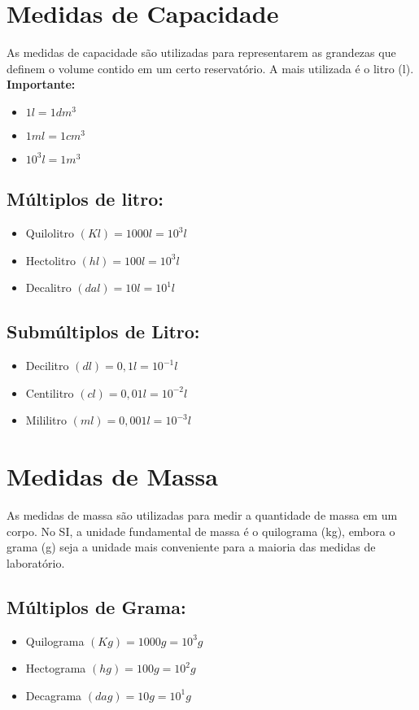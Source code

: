 \documentclass[11pt,fleqn]{book} %
\begin{document}
\section{Medidas de Capacidade}
As medidas de capacidade são utilizadas para representarem
as grandezas que definem o volume contido em um certo
reservatório. A mais utilizada é o litro (l).
	\\\textbf{Importante:}
\begin{itemize}
    \item $1l = 1dm^3$
    \item $1 ml = 1 cm^3$
    \item $10^3 l = 1 m^3$
\end{itemize}
\subsection{Múltiplos de litro:}
\begin{itemize}
    \item Quilolitro $(Kl) = 1000 l = 10^3 l$
    \item Hectolitro $(hl) = 100 l = 10^3 l$
    \item Decalitro $(dal) = 10 l = 10^1l$
\end{itemize}
\subsection{Submúltiplos de Litro:}
\begin{itemize}
    \item Decilitro $(dl) = 0,1 l = 10^{-1}l$
    \item Centilitro $(cl) = 0,01 l = 10^{-2}l$
    \item Mililitro $(ml) = 0,001 l = 10^{-3}l$
\end{itemize}
\section{Medidas de Massa}
As medidas de massa são utilizadas para medir a quantidade
de massa em um corpo. No SI, a unidade fundamental de massa é
o quilograma (kg), embora o grama (g) seja a unidade mais
conveniente para a maioria das medidas de laboratório.
\subsection{Múltiplos de Grama:}
\begin{itemize}
    \item Quilograma $(Kg) = 1000 g = 10^3 g$
    \item Hectograma $(hg) = 100 g = 10^2 g$
    \item Decagrama $(dag) = 10 g = 10^1 g$
\end{itemize}
\end{document}
